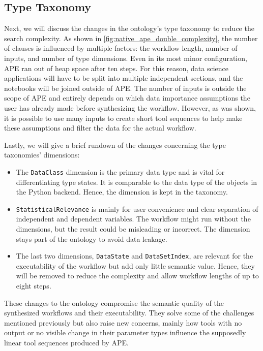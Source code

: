 \subsection{Type Taxonomy}
Next, we will discuss the changes in the ontology's type taxonomy to reduce the search complexity. As shown in \autoref{fig:native_ape_double_complexity}, the number of clauses is influenced by multiple factors: the workflow length, number of inputs, and number of type dimensions. Even in its most minor configuration, APE ran out of heap space after ten steps. For this reason, data science applications will have to be split into multiple independent sections, and the notebooks will be joined outside of APE. The number of inputs is outside the scope of APE and entirely depends on which data importance assumptions the user has already made before synthesizing the workflow. However, as was shown, it is possible to use many inputs to create short tool sequences to help make these assumptions and filter the data for the actual workflow.

Lastly, we will give a brief rundown of the changes concerning the type taxonomies' dimensions:
\begin{itemize}
    \item The \verb|DataClass| dimension is the primary data type and is vital for differentiating type states. It is comparable to the data type of the objects in the Python backend. Hence, the dimension is kept in the taxonomy.
    \item \verb|StatisticalRelevance| is mainly for user convenience and clear separation of independent and dependent variables. The workflow might run without the dimensions, but the result could be misleading or incorrect. The dimension stays part of the ontology to avoid data leakage.
    \item The last two dimensions, \verb|DataState| and \verb|DataSetIndex|, are relevant for the executability of the workflow but add only little semantic value. Hence, they will be removed to reduce the complexity and allow workflow lengths of up to eight steps.
\end{itemize}

These changes to the ontology compromise the semantic quality of the synthesized workflows and their executability. They solve some of the challenges mentioned previously but also raise new concerns, mainly how tools with no output or no visible change in their parameter types influence the supposedly linear tool sequences produced by APE.

